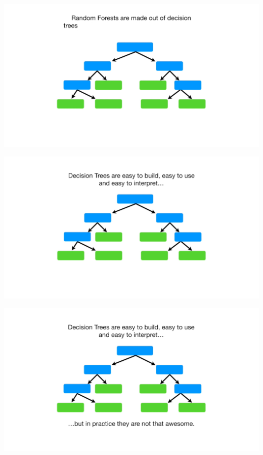 \documentclass[
  ignorenonframetext,
]{beamer}
\begin{document}
\begin{frame}{}
\protect\hypertarget{section-2}{}
\includegraphics{images/r3.png}
\end{frame}

\begin{frame}{}
\protect\hypertarget{section-3}{}
\includegraphics{images/r4.png}
\end{frame}

\begin{frame}{}
\protect\hypertarget{section-4}{}
\includegraphics{images/r5.png}
\end{frame}
\end{document}
